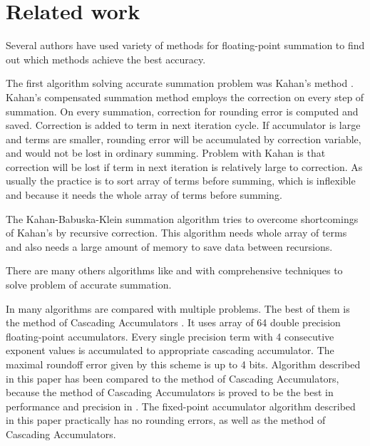 \documentclass[conference]{IEEEtran}
\begin{document}
\section{Related work}
Several authors have used variety of methods for floating-point 
summation to find out which methods achieve the best accuracy. 
\par
The first algorithm solving accurate summation problem was Kahan's method \cite{Kahan}. 
Kahan's compensated summation method employs the correction 
on every step of summation. 
On every summation, correction for rounding error is computed and saved.
Correction is added to term in next iteration cycle.
If accumulator is large and terms are smaller, rounding error will be accumulated by correction variable, 
and would not be lost in ordinary summing.
Problem with Kahan is that correction will be lost if term in next iteration is relatively large to correction.
As usually the practice is to sort array of terms before summing, 
which is inflexible and because it needs the whole array of terms before summing.
\par
The Kahan-Babuska-Klein summation algorithm \cite{KahanBabuskaKlein} tries to overcome shortcomings of Kahan's by recursive correction.
This algorithm needs whole array of terms and also needs a large amount of memory to save data between recursions.
\par
There are many others algorithms like \cite{DemmelAndHida} and \cite{DistillationAlgo} with comprehensive techniques 
to solve problem of accurate summation.
\par
In \cite{ComparisonOfMethods} many algorithms are compared with multiple problems.
The best of them is the method of Cascading Accumulators \cite{CascadingAccumulators}.
It uses array of 64 double precision floating-point accumulators.
Every single precision term with 4 consecutive exponent values is accumulated to appropriate cascading accumulator.
The maximal roundoff error given by this scheme is up to 4 bits.
Algorithm described in this paper has been compared to the method of Cascading Accumulators,
because the method of Cascading Accumulators is proved 
to be the best in performance and precision in \cite{ComparisonOfMethods}.
The fixed-point accumulator algorithm described in this paper practically has no rounding errors,
as well as the method of Cascading Accumulators.
\end{document}
